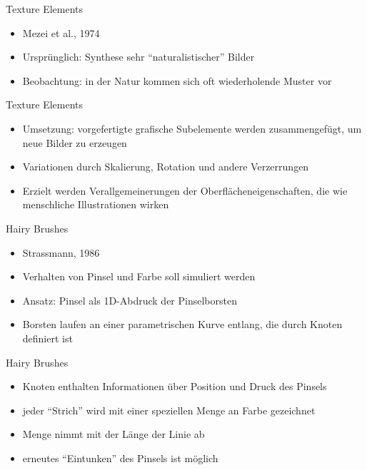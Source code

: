 \begin{frame}{Texture Elements}
  \begin{itemize}
    \item Mezei et al., 1974
    \item Ursprünglich: Synthese sehr "`naturalistischer"' Bilder
    \item Beobachtung: in der Natur kommen sich oft
    wiederholende Muster vor
  \end{itemize}
\end{frame}

\begin{frame}{Texture Elements}
  \begin{itemize}
    \item Umsetzung: vorgefertigte grafische Subelemente
    werden zusammengefügt, um neue Bilder zu
    erzeugen
    \item Variationen durch Skalierung, Rotation und andere
    Verzerrungen
    \item Erzielt werden Verallgemeinerungen der
    Oberflächeneigenschaften, die wie menschliche
    Illustrationen wirken
  \end{itemize}
\end{frame}

\begin{frame}{Hairy Brushes}
  \begin{itemize}
    \item Strassmann, 1986
    \item Verhalten von Pinsel und Farbe soll simuliert werden
    \item Ansatz: Pinsel als 1D-Abdruck der Pinselborsten
    \item Borsten laufen an einer parametrischen Kurve
    entlang, die durch Knoten definiert ist
  \end{itemize}
\end{frame}

\begin{frame}{Hairy Brushes}
  \begin{itemize}
    \item Knoten enthalten Informationen über Position und
    Druck des Pinsels
    \item jeder "`Strich"' wird mit einer speziellen Menge an
    Farbe gezeichnet
    \item Menge nimmt mit der Länge der Linie ab
    \item erneutes "`Eintunken"' des Pinsels ist möglich
  \end{itemize}
\end{frame}

